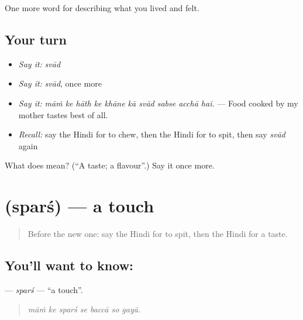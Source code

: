 \begin{grammarlens}[title={What you've built}]
One more word for describing what you lived and felt.
\end{grammarlens}

\subsection*{Your turn}
\begin{itemize}
\raggedright
  \item \emph{Say it:} \emph{svād}
  \item \emph{Say it:} \emph{svād}, once more
  \item \emph{Say it:} \emph{māṁ ke hāth ke khāne kā svād sabse acchā hai.} — Food cooked by my mother tastes best of all.
  \item \emph{Recall:} say the Hindi for to chew, then the Hindi for to spit, then say \emph{svād} again
\end{itemize}

\begin{tcolorbox}[breakable,colback=teal!4,colframe=teal!35!black,title={Before you move on}]
What does  mean? (\textquotedblleft{}A taste; a flavour\textquotedblright{}.) Say it once more.
\end{tcolorbox}
\section[\texorpdfstring{\hi{स्पर्श} (sparś)}{स्पर्श (sparś)}]{ (sparś) — a touch}

\label{lesson:HI-C480-spars}



\begin{quote}
Before the new one: say the Hindi for to spit, then the Hindi for a taste.
\end{quote}

\subsection*{You'll want to know: }
\textbf{} — \emph{sparś} — \textquotedblleft{}a touch\textquotedblright{}.

\begin{quote}
      
\end{quote}

\begin{quote}
\emph{māṁ ke sparś se baccā so gayā.}
\end{quote}

